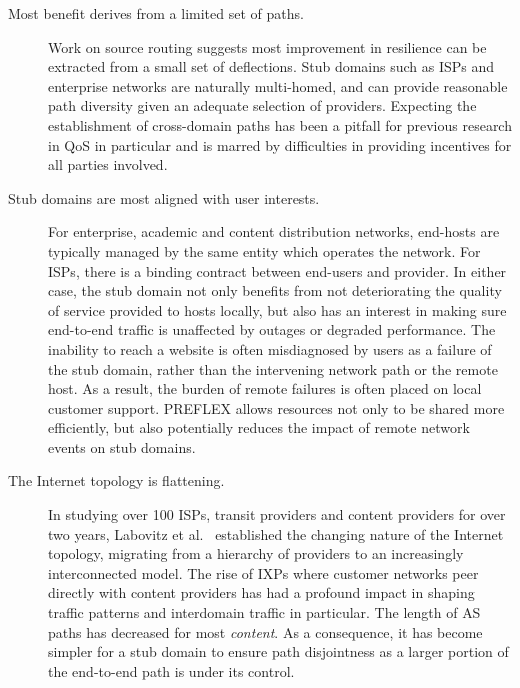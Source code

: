 \renewcommand{\descriptionlabel}[1]{\hspace{\labelsep}\textbf{#1}}
\begin{description}
\item[Most benefit derives from a limited set of paths.]{Work on source routing \cite{Gummadi:2004p131,Yang:2006p405} suggests most improvement in resilience can be extracted from a small set of deflections.
    Stub domains such as \acp{ISP} and enterprise networks are naturally multi-homed, and can provide reasonable path diversity given an adequate selection of providers.
    Expecting the establishment of cross-domain paths has been a pitfall for previous research in \ac{QoS} in particular and is marred by difficulties in providing incentives for all parties involved.
}

\item[Stub domains are most aligned with user interests.]{
    For enterprise, academic and content distribution networks, end-hosts are typically managed by the same entity which operates the network.
    For \acp{ISP}, there is a binding contract between end-users and provider.
    In either case, the stub domain not only benefits from not deteriorating the quality of service provided to hosts locally, but also has an interest in making sure end-to-end traffic is unaffected by outages or degraded performance.
    The inability to reach a website is often misdiagnosed by users as a failure of the stub domain, rather than the intervening network path or the remote host.
    As a result, the burden of remote failures is often placed on local customer support.
    \ac{PREFLEX} allows resources not only to be shared more efficiently, but also potentially reduces the impact of remote network events on stub domains.
}

\item[The Internet topology is flattening.]{
    In studying over 100 \acp{ISP}, transit providers and content providers for over two years, Labovitz et al.\ \cite{Labovitz:2010p175} established the changing nature of the Internet topology, migrating from a hierarchy of providers to an increasingly interconnected model.
    The rise of \acp{IXP} where customer networks peer directly with content providers has had a profound impact in shaping traffic patterns and interdomain traffic in particular.
    The length of \ac{AS} paths has decreased for most \emph{content}.
    As a consequence, it has become simpler for a stub domain to ensure path disjointness as a larger portion of the end-to-end path is under its control.
}
\end{description}

